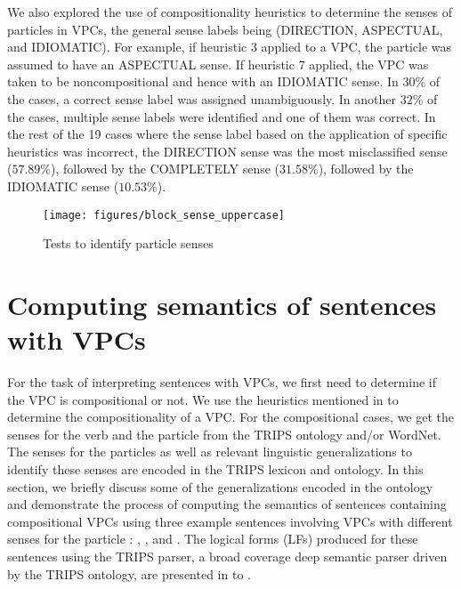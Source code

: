 \documentclass[output=paper,modfonts,nonflat]{langsci/langscibook}
\begin{document}
\largerpage[2]
We also explored the use of compositionality heuristics to determine the senses of particles in VPCs, the general sense labels being (DIRECTION, ASPECTUAL, and IDIOMATIC). For example, if heuristic 3 applied to a VPC, the particle was assumed to have an ASPECTUAL sense. If heuristic 7 applied, the VPC was taken to be noncompositional and hence with an IDIOMATIC sense. In $30\%$ of the cases, a correct sense label was assigned unambiguously. In another $32\%$ of the cases, multiple sense labels were identified and one of them was correct. In the rest of the 19 cases where the sense label based on the application of specific heuristics was incorrect, the DIRECTION sense was the most misclassified sense ($57.89\%$), followed by the COMPLETELY sense ($31.58\%$), followed by the IDIOMATIC sense ($10.53\%$).
\clearpage 

   \begin{figure}[t]
\texttt{[image: figures/block\_sense\_uppercase]}
\caption{Tests to identify particle senses}\label{fig:tests-senses}
\end{figure}


\section{Computing semantics of sentences with VPCs} \label{sec:generalizations} 
\largerpage
For the task of interpreting sentences with VPCs, we first need to determine if the VPC is compositional or not. We use the heuristics mentioned in  to determine the compositionality of a VPC. For the compositional cases, we get the senses for the verb and the particle from the TRIPS ontology and/or WordNet. The senses for the particles as well as relevant linguistic generalizations to identify these senses are encoded in the TRIPS lexicon and ontology. 
In this section, we briefly discuss some of the generalizations encoded in the ontology and demonstrate the process of computing the semantics of sentences containing compositional VPCs using three example sentences involving VPCs with different senses for the particle : , , and . The logical forms (LFs) produced for these sentences using the TRIPS parser, a broad coverage deep semantic parser driven by the TRIPS ontology, are presented in  to .
\clearpage 
\end{document}
